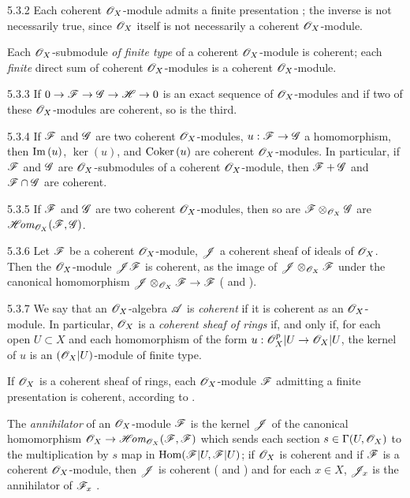 \begin{env}{5.3.2}
\label{env-0.5.3.2}
Each coherent $\mathscr{O}_X$-module admits a finite presentation ; the inverse is
not necessarily true, since $\mathscr{O}_X$ itself is not necessarily a coherent $\mathscr{O}_X$-module.

Each $\mathscr{O}_X$-submodule \emph{of finite type} of a coherent $\mathscr{O}_X$-module is coherent; each
\emph{finite} direct sum of coherent $\mathscr{O}_X$-modules is a coherent $\mathscr{O}_X$-module.
\end{env}

\begin{env}{5.3.3}
\label{env-0.5.3.3}
If $0\to\mathscr{F}\to\mathscr{G}\to\mathscr{H}\to 0$ is an exact sequence  of $\mathscr{O}_X$-modules and if two of
these $\mathscr{O}_X$-modules are coherent, so is the third.
\end{env}

\begin{env}{5.3.4}
\label{env-0.5.3.4}
If $\mathscr{F}$ and $\mathscr{G}$ are two coherent $\mathscr{O}_X$-modules, $u:\mathscr{F}\to\mathscr{G}$ a
homomorphism, then ${\mathop{\mathrm{Im}}\nolimits}\,(u)$, $\ker(u)$, and ${\mathop{\mathrm{Coker}}\nolimits}\,(u)$ are coherent $\mathscr{O}_X$-modules. In
particular, if $\mathscr{F}$ and $\mathscr{G}$ are $\mathscr{O}_X$-submodules of a coherent $\mathscr{O}_X$-module,
then $\mathscr{F}+\mathscr{G}$ and $\mathscr{F}\cap\mathscr{G}$ are coherent.
\end{env}

\begin{env}{5.3.5}
\label{env-0.5.3.5}
If $\mathscr{F}$ and $\mathscr{G}$ are two coherent $\mathscr{O}_X$-modules, then so are
$\mathscr{F}\otimes_{\mathscr{O}_X}\mathscr{G}$ are $\mathscr{H}\!\textit{om}_{\mathscr{O}_X}(\mathscr{F},\mathscr{G})$.
\end{env}

\begin{env}{5.3.6}
\label{env-0.5.3.6}
Let $\mathscr{F}$ be a coherent $\mathscr{O}_X$-module, $\mathscr{J}$ a coherent sheaf of ideals of $\mathscr{O}_X$.
Then the $\mathscr{O}_X$-module $\mathscr{J}\mathscr{F}$ is coherent, as the image of
$\mathscr{J}\otimes_{\mathscr{O}_X}\mathscr{F}$ under the canonical homomorphism
$\mathscr{J}\otimes_{\mathscr{O}_X}\mathscr{F}\to\mathscr{F}$ ( and ).
\end{env}

\begin{env}{5.3.7}
\label{env-0.5.3.7}
We say that an $\mathscr{O}_X$-algebra $\mathscr{A}$ is \emph{coherent} if it is coherent as an
$\mathscr{O}_X$-module. In particular, $\mathscr{O}_X$ is a \emph{coherent sheaf of rings} if, and only if,
for each open $U\subset X$ and each homomorphism of the form $u:\mathscr{O}_X^p|U\to\mathscr{O}_X|U$, the
kernel of $u$ is an $(\mathscr{O}_X|U)$-module of finite type.

If $\mathscr{O}_X$ is a coherent sheaf of rings, each $\mathscr{O}_X$-module $\mathscr{F}$ admitting a finite
presentation  is coherent, according to .

The \emph{annihilator} of an $\mathscr{O}_X$-module $\mathscr{F}$ is the kernel $\mathscr{J}$ of the canonical
homomorphism $\mathscr{O}_X\to\mathscr{H}\!\textit{om}_{\mathscr{O}_X}(\mathscr{F},\mathscr{F})$ which sends each section
$s\in\Gamma(U,\mathscr{O}_X)$ to the multiplication by $s$ map in ${\mathop{\mathrm{Hom}}\nolimits}(\mathscr{F}|U,\mathscr{F}|U)$; if
$\mathscr{O}_X$ is coherent and if $\mathscr{F}$ is a coherent $\mathscr{O}_X$-module, then $\mathscr{J}$ is coherent
( and ) and for each $x\in X$, $\mathscr{J}_x$ is the
annihilator of $\mathscr{F}_x$ .
\end{env}


